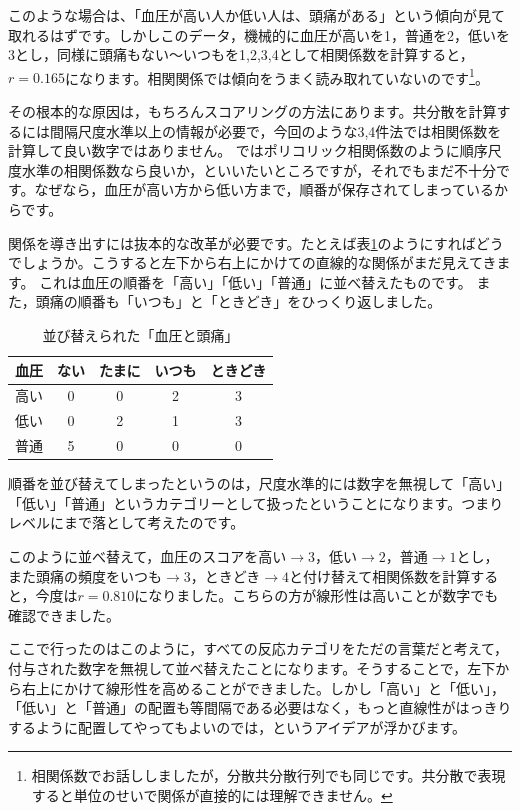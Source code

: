 \documentclass{ltjsbook}
\begin{document}
このような場合は、「血圧が高い人か低い人は、頭痛がある」という傾向が見て取れるはずです。しかしこのデータ，機械的に血圧が高いを1，普通を2，低いを3とし，同様に頭痛もない〜いつもを1,2,3,4として相関係数を計算すると，$r=0.165$になります。相関関係では傾向をうまく読み取れていないのです\footnote{相関係数でお話ししましたが，分散共分散行列でも同じです。共分散で表現すると単位のせいで関係が直接的には理解できません。}。

その根本的な原因は，もちろんスコアリングの方法にあります。共分散を計算するには間隔尺度水準以上の情報が必要で，今回のような3,4件法では相関係数を計算して良い数字ではありません。
ではポリコリック相関係数のように順序尺度水準の相関係数なら良いか，といいたいところですが，それでもまだ不十分です。なぜなら，血圧が高い方から低い方まで，順番が保存されてしまっているからです。

関係を導き出すには抜本的な改革が必要です。たとえば表\ref{tbl::14_02}のようにすればどうでしょうか。こうすると左下から右上にかけての直線的な関係がまだ見えてきます。
これは血圧の順番を「高い」「低い」「普通」に並べ替えたものです。
また，頭痛の順番も「いつも」と「ときどき」をひっくり返しました。
\begin{table}[h]
    \begin{center}
        \caption{並び替えられた「血圧と頭痛」}
        \begin{tabular}{c|cccc}
            血圧 & ない & たまに & いつも & ときどき \\
            \hline
            高い & 0  & 0   & 2   & 3    \\
            低い & 0  & 2   & 1   & 3    \\
            普通 & 5  & 0   & 0   & 0    \\
        \end{tabular}
        \label{tbl::14_02}
    \end{center}
\end{table}
順番を並び替えてしまったというのは，尺度水準的には数字を無視して「高い」「低い」「普通」というカテゴリーとして扱ったということになります。つまりレベルにまで落として考えたのです。

このように並べ替えて，血圧のスコアを高い$\to3$，低い$\to2$，普通$\to1$とし，また頭痛の頻度をいつも$\to3$，ときどき$\to4$と付け替えて相関係数を計算すると，今度は$r=0.810$になりました。こちらの方が線形性は高いことが数字でも確認できました。

ここで行ったのはこのように，すべての反応カテゴリをただの言葉だと考えて，付与された数字を無視して並べ替えたことになります。そうすることで，左下から右上にかけて線形性を高めることができました。しかし「高い」と「低い」，「低い」と「普通」の配置も等間隔である必要はなく，もっと直線性がはっきりするように配置してやってもよいのでは，というアイデアが浮かびます。
\end{document}
